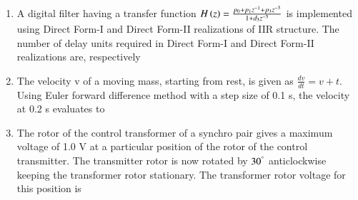 \documentclass[journal,12pt,onecolumn]{IEEEtran}
\theoremstyle{remark}
\begin{document}
\begin{enumerate}
\item A digital filter having a transfer function $H\left(z\right) = \frac{p_0 + p_1 z^{-1} + p_3 z^{-3}}{1 + d_3 z^{-3}}$ is implemented using Direct Form-I and Direct Form-II realizations of IIR structure. The number of delay units required in Direct Form-I and Direct Form-II realizations are, respectively
\hfill{}\begin{enumerate}  \end{enumerate}



\item The velocity v  of a moving mass, starting from rest, is given as $\frac{dv}{dt} = v+t$. Using Euler forward difference method  with a step size of 0.1 s, the velocity at 0.2 s evaluates to
\hfill{}\begin{enumerate}  \end{enumerate}



\item The rotor of the control transformer of a synchro pair gives a maximum voltage of 1.0 V at a particular position of the rotor of the control transmitter. The transmitter rotor is now rotated by $30^\degree$ anticlockwise keeping the transformer rotor stationary. The transformer rotor voltage for this position is
\hfill{}\begin{enumerate}  \end{enumerate}




\end{enumerate}
\end{document}
